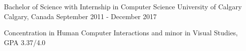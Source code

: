 \begin{cventries}
  \cventry
    {Bachelor of Science with Internship in Computer Science}
    {University of Calgary}
    {Calgary, Canada}
    {September 2011 - December 2017}
    {
      \begin{cvitems}
      \item {Concentration in Human Computer Interactions and minor in Visual Studies, GPA 3.37/4.0}
      \end{cvitems}
    }
\end{cventries}
